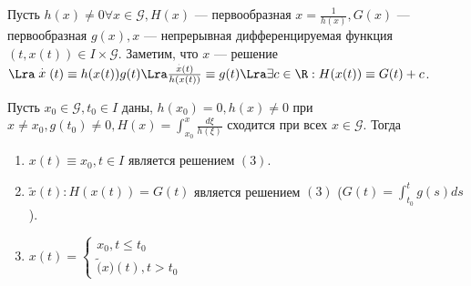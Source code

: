 Пусть \(h(x) \ne 0 \forall x \in \mathcal{G}, H(x)\) --- первообразная \(x = \frac{1}{h(x)}, G(x)\) --- первообразная \(g(x), x\) --- непрерывная дифференцируемая функция \((t, x(t)) \in I \times \mathcal{G}\). Заметим, что \(x\) --- решение \(\Lra \stackrel{.}{x}(t) \equiv h(x(t)) g(t) \Lra \frac{\stackrel{.}{x}(t)}{h(x(t))} \equiv g(t) \Lra \exists c \in \R: H(x(t)) \equiv G(t) + c\).

Пусть \(x_0 \in \mathcal{G}, t_0 \in I\) даны, \(h(x_0) = 0, h(x) \ne 0\) при \(x \ne x_0, g(t_0) \ne 0, H(x) = \int_{x_0}^x \frac{d\xi}{h(\xi)}\) сходится при всех \(x \in \mathcal{G}\). Тогда 
\begin{enumerate}
    \item \(x(t) \equiv x_0, t \in I\) является решением \((3)\).
    
    \item \(\tilde{x}(t): H(x(t)) = G(t)\) является решением \((3)\) (\(G(t) = \int_{t_0}^t g(s)ds\)).
    
    \item \(x(t) = \left\{\begin{array}{l}
        x_0, t \le t_0 \\
        \tilde(x)(t), t > t_0
    \end{array}\right.\)
\end{enumerate}